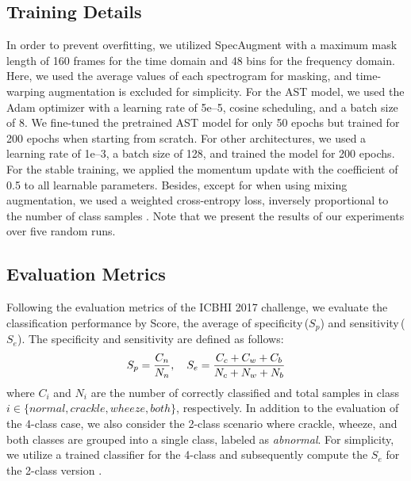 \documentclass{INTERSPEECH2023}
\begin{document}
\subsection{Training Details}
\vspace{-2pt}



In order to prevent overfitting, we utilized SpecAugment \cite{park2019specaugment} with a maximum mask length of 160 frames for the time domain and 48 bins for the frequency domain. Here, we used the average values of each spectrogram for masking, and time-warping augmentation is excluded for simplicity.
For the AST model, we used the Adam optimizer with a learning rate of 5e--5, cosine scheduling, and a batch size of 8. We fine-tuned the pretrained AST model for only 50 epochs but trained for 200 epochs when starting from scratch.
For other architectures, we used a learning rate of 1e--3, a batch size of 128, and trained the model for 200 epochs. For the stable training, we applied the momentum update with the coefficient of 0.5 to all learnable parameters. Besides, except for when using mixing augmentation, we used a weighted cross-entropy loss, inversely proportional to the number of class samples \cite{gairola2021respirenet, moummad2022supervised}.
Note that we present the results of our experiments over five random runs.
\vspace{-5pt}


\subsection{Evaluation Metrics}
\vspace{-2pt}


Following the evaluation metrics of the ICBHI 2017 challenge, we evaluate the classification performance by Score, the average of specificity\,($S_p$) and sensitivity\,($S_e$).
The specificity and sensitivity are defined as follows: 
\vspace{-2pt}
\begin{equation}
S_p = \frac{C_n}{N_n}, \quad
S_e = \frac{C_c + C_w + C_b}{N_c + N_w + N_b}
\vspace{-2pt}
\end{equation}
where $C_i$ and $N_i$ are the number of correctly classified and total samples in class $i \in \{ normal, crackle, wheeze, both \}$, respectively.
In addition to the evaluation of the 4-class case, we also consider the 2-class scenario where crackle, wheeze, and both classes are grouped into a single class, labeled as \textit{abnormal}. For simplicity, we utilize a trained classifier for the 4-class and subsequently compute the $S_e$ for the 2-class version \cite{nguyen2022lung}.
\end{document}

